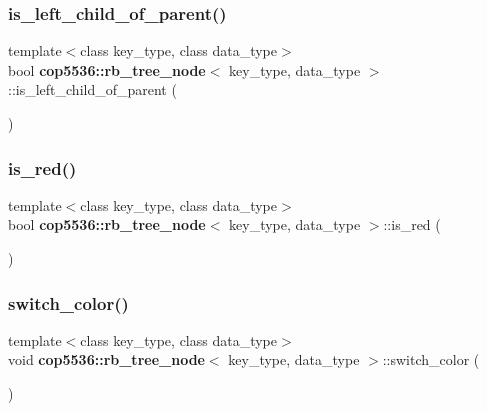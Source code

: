 \subsubsection{is\_left\_child\_of\_parent()}
{\footnotesize\ttfamily template$<$class key\+\_\+type, class data\+\_\+type$>$ \\
bool \textbf{ cop5536\+::rb\+\_\+tree\+\_\+node}$<$ key\+\_\+type, data\+\_\+type $>$\+::is\+\_\+left\+\_\+child\+\_\+of\+\_\+parent (\begin{DoxyParamCaption}{ }\end{DoxyParamCaption})\hspace{0.3cm}{\ttfamily [inline]}}

\mbox{\label{structcop5536_1_1rb__tree__node_ad37b7f5a02343340d995ab29541c4bc6}} 
\subsubsection{is\_red()}
{\footnotesize\ttfamily template$<$class key\+\_\+type, class data\+\_\+type$>$ \\
bool \textbf{ cop5536\+::rb\+\_\+tree\+\_\+node}$<$ key\+\_\+type, data\+\_\+type $>$\+::is\+\_\+red (\begin{DoxyParamCaption}{ }\end{DoxyParamCaption})\hspace{0.3cm}{\ttfamily [inline]}}

\mbox{\label{structcop5536_1_1rb__tree__node_a5a959fba99161c78974cba0dcd3e8ebf}} 
\subsubsection{switch\_color()}
{\footnotesize\ttfamily template$<$class key\+\_\+type, class data\+\_\+type$>$ \\
void \textbf{ cop5536\+::rb\+\_\+tree\+\_\+node}$<$ key\+\_\+type, data\+\_\+type $>$\+::switch\+\_\+color (\begin{DoxyParamCaption}{ }\end{DoxyParamCaption})\hspace{0.3cm}{\ttfamily [inline]}}



